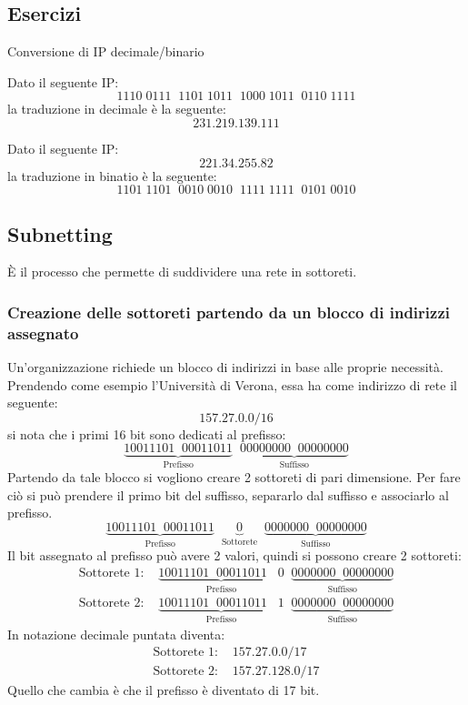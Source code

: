 \documentclass[a4paper]{article}
\begin{document}
\subsection{Esercizi}
Conversione di IP decimale/binario
\begin{exercise}
  Dato il seguente IP:
  \[
    1110 \; 0111 \;\; 1101 \; 1011 \;\; 1000 \; 1011 \;\; 0110 \; 1111
  \] 
  la traduzione in decimale è la seguente:
  \[
    231.219.139.111
  \] 
\end{exercise}
\begin{exercise}
  Dato il seguente IP:
  \[
    221.34.255.82
  \] 
  la traduzione in binatio è la seguente:
  \[
    1101 \; 1101 \;\; 0010 \; 0010 \;\; 1111 \; 1111 \;\; 0101 \; 0010
  \] 
\end{exercise}

\subsection{Subnetting}
È il processo che permette di suddividere una rete in sottoreti.

\subsubsection{Creazione delle sottoreti partendo da un blocco di indirizzi assegnato}
Un'organizzazione richiede un blocco di indirizzi in base alle proprie necessità.
Prendendo come esempio l'Università di Verona, essa ha come indirizzo di rete il seguente:
\[
  157.27.0.0/16
\] 
si nota che i primi 16 bit sono dedicati al prefisso:
\[
  \underbrace{10011101 \;\; 00011011}_{\text{Prefisso}} \;\; \underbrace{00000000 \;\; 00000000}_{\text{Suffisso}}
\] 
Partendo da tale blocco si vogliono creare 2 sottoreti di pari dimensione. Per fare ciò
si può prendere il primo bit del suffisso, separarlo dal suffisso e associarlo al prefisso.
\[
  \underbrace{10011101 \;\; 00011011}_{\text{Prefisso}} \;\;
  \underbrace{0}_{\text{Sottorete}} \;\;
  \underbrace{0000000 \;\; 00000000}_{\text{Suffisso}}
\] 
Il bit assegnato al prefisso può avere 2 valori, quindi si possono creare 2 sottoreti:
\[
  \begin{aligned}
    \text{Sottorete 1: } &
    \underbrace{10011101 \;\; 00011011 \;\;\; 0}_{\text{Prefisso}} \;\;
    \underbrace{0000000 \;\; 00000000}_{\text{Suffisso}}\\
    \text{Sottorete 2: } &
    \underbrace{10011101 \;\; 00011011 \;\;\; 1}_{\text{Prefisso}} \;\;
    \underbrace{0000000 \;\; 00000000}_{\text{Suffisso}}
  \end{aligned}
\]
In notazione decimale puntata diventa:
\[
  \begin{aligned}
    \text{Sottorete 1: } &
    157.27.0.0/17\\
    \text{Sottorete 2: } &
    157.27.128.0/17
  \end{aligned}
\]
Quello che cambia è che il prefisso è diventato di 17 bit.
\end{document}
